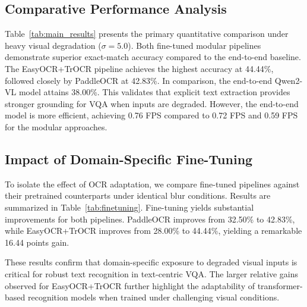 \documentclass[conference]{IEEEtran}
\begin{document}
\subsection{Comparative Performance Analysis}

Table~\ref{tab:main_results} presents the primary quantitative comparison under heavy visual degradation ($\sigma = 5.0$). 
Both fine-tuned modular pipelines demonstrate superior exact-match accuracy compared to the end-to-end baseline. The EasyOCR+TrOCR pipeline achieves the highest accuracy at 44.44\%, followed closely by PaddleOCR at 42.83\%. In comparison, the end-to-end Qwen2-VL model attains 38.00\%. This validates that explicit text extraction provides stronger grounding for VQA when inputs are degraded.
However, the end-to-end model is more efficient, achieving 0.76 FPS compared to 0.72 FPS and 0.59 FPS for the modular approaches.

\begin{table}[t]
\centering
\caption{Main Performance Comparison (Blur $\sigma=5.0$, $n=1242$)}
\label{tab:main_results}
\setlength{\tabcolsep}{4pt}
\renewcommand{\arraystretch}{1.08}
\scriptsize
{}
\end{table}

\subsection{Impact of Domain-Specific Fine-Tuning}

To isolate the effect of OCR adaptation, we compare fine-tuned pipelines against their pretrained counterparts under identical blur conditions. Results are summarized in Table~\ref{tab:finetuning}. Fine-tuning yields substantial improvements for both pipelines. PaddleOCR improves from 32.50\% to 42.83\%, while EasyOCR+TrOCR improves from 28.00\% to 44.44\%, yielding a remarkable 16.44 points gain.

These results confirm that domain-specific exposure to degraded visual inputs is critical for robust text recognition in text-centric VQA. The larger relative gains observed for EasyOCR+TrOCR further highlight the adaptability of transformer-based recognition models when trained under challenging visual conditions.
\end{document}
